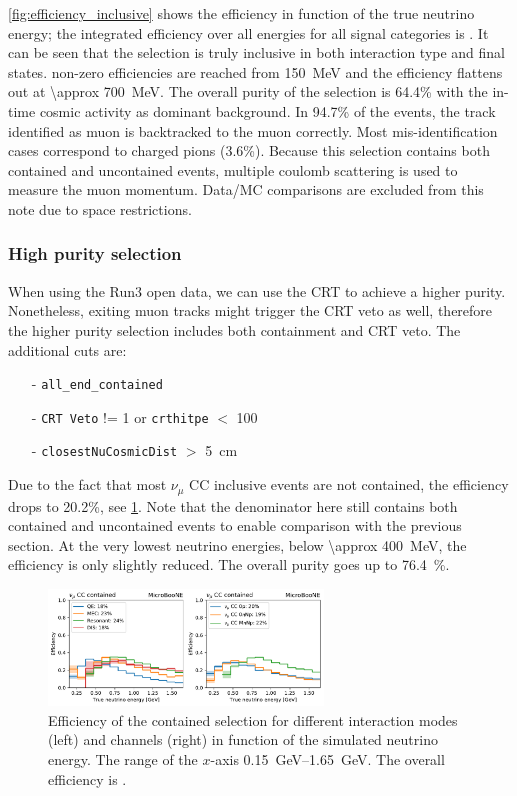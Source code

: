 \cref{fig:efficiency_inclusive} shows the efficiency in function of the true neutrino energy;  the integrated  efficiency over all energies for all signal categories is . It can be seen that the selection is truly inclusive in both interaction type and final states. non-zero efficiencies are reached from \SI{150}{\MeV} and the efficiency flattens out at \SI{\approx 700}{\MeV}. The overall purity of the selection is 64.4\% with the in-time cosmic activity as dominant background. In 94.7\% of the events, the track identified as muon is backtracked to the muon correctly. Most mis-identification cases correspond to charged pions (3.6\%). Because this selection contains both contained and uncontained events, multiple coulomb scattering is used to measure the muon momentum. Data/MC comparisons are excluded from this note due to space restrictions. 
 
\subsubsection{High purity selection}
When using the Run3 open data, we can use the CRT to achieve  a higher purity. Nonetheless, exiting muon tracks might trigger the CRT veto as well, therefore the higher purity selection includes both containment and CRT veto. The additional cuts are:
\begin{itemize}
    \item[-] \texttt{all\_end\_contained}
    \item[-] \texttt{CRT Veto} != 1 or \texttt{crthitpe} $<$ 100
    \item[-] \texttt{closestNuCosmicDist} $>$ \SI{5}{\cm}
\end{itemize}
Due to the fact that most $\nu_\mu$ CC inclusive events are not contained, the efficiency drops to 20.2\%, see \cref{fig:efficiency_contained}. Note that the denominator here still contains both contained and uncontained events to enable comparison with the previous section. At the very lowest neutrino energies, below \SI{\approx 400}{\MeV}, the efficiency is only slightly reduced. The overall purity goes up to \SI{76.4}{\%}. 

\begin{figure}[htb]
\centering
\includegraphics[width=0.65\textwidth]{Inclusive/Images/efficiency_contained.pdf}
\caption[Efficiency of the contained \numucc selection for different interaction modes and channels]{Efficiency of the contained \numucc selection for different interaction modes (left) and channels (right) in function of the simulated neutrino energy. The range of the $x$-axis \SIrange{0.15}{1.65}{\GeV}. The overall efficiency is .}
\label{fig:efficiency_contained}
\end{figure}

